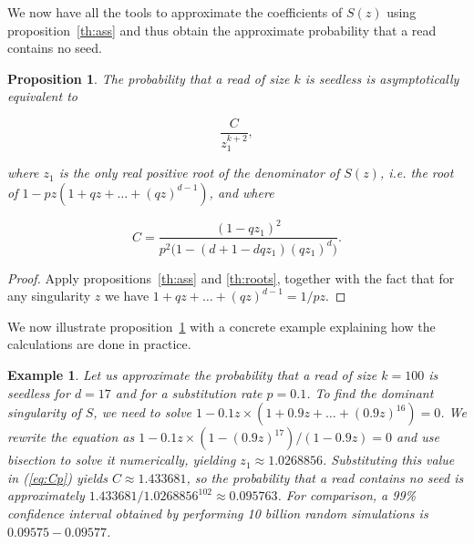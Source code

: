 \documentclass{article}
\newtheorem{example}{Example}
\newtheorem{proposition}{Proposition}
\begin{document}
We now have all the tools to approximate the coefficients of $S(z)$ using
proposition~\ref{th:ass} and thus obtain the approximate probability that
a read contains no seed.

\begin{proposition}
\label{th:p}
The probability that a read of size $k$ is seedless is
asymptotically equivalent to

\begin{equation*}
\frac{C}{z_1^{k+2}},
\end{equation*}

\noindent
where $z_1$ is the only real positive root of the denominator of $S(z)$,
\textit{i.e.} the root of $1-pz(1+qz+\ldots+(qz)^{d-1})$, and where

\begin{equation}
\label{eq:Cp}
C =\frac{(1-qz_1)^2}{p^2\big( 1-(d+1-dqz_1)(qz_1)^d \big)}.
\end{equation}
\end{proposition}

\begin{proof}
Apply propositions~\ref{th:ass} and \ref{th:roots}, together with the fact
that for any singularity $z$ we have $1+qz+\ldots+(qz)^{d-1} = 1/pz$.
\end{proof}

We now illustrate proposition~\ref{th:p} with a concrete example
explaining how the calculations are done in practice.

\begin{example}
\label{ex:num1}
Let us approximate the probability that a read of size $k=100$ is seedless
for $d=17$ and for a substitution rate $p=0.1$. To find the dominant
singularity of $S$, we need to solve
$1-0.1z\times(1+0.9z+\ldots+(0.9z)^{16}) = 0$.  We rewrite the equation as
$1 - 0.1z\times(1-(0.9 z)^{17})/(1-0.9z) = 0$ and use bisection to solve
it numerically, yielding $z_1 \approx 1.0268856$. Substituting this value
in (\ref{eq:Cp}) yields $C \approx 1.433681$, so the probability that a
read contains no seed is approximately $1.433681 / 1.0268856^{102} \approx
0.095763$. For comparison, a 99\% confidence interval obtained by
performing 10 billion random simulations is $0.09575-0.09577$.
\end{example}
\end{document}
